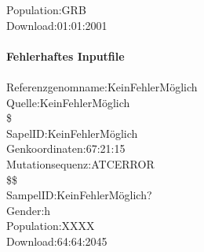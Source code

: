 Population:GRB\\
Download:01:01:2001\\
\\
\textbf{Fehlerhaftes Inputfile}\\
\\
Referenzgenomname:KeinFehlerMöglich\\
Quelle:KeinFehlerMöglich\\
\$\\
SapelID:KeinFehlerMöglich\\
Genkoordinaten:67:21:15\\
Mutationsequenz:ATCERROR\\
\$\$\\
SampelID:KeinFehlerMöglich?\\
Gender:h\\
Population:XXXX\\
Download:64:64:2045\\
